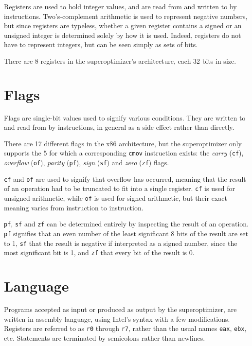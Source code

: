 \documentclass[a4paper,11pt]{kth-mag}
\begin{document}
Registers are used to hold integer values, and are read from and written to by instructions.
Two's-complement arithmetic is used to represent negative numbers, but since registers are typeless, whether a given register contains a signed or an unsigned integer is determined solely by how it is used.
Indeed, registers do not have to represent integers, but can be seen simply as sets of bits.

There are 8 registers in the superoptimizer's architecture, each 32 bits in size.

\section{Flags}
\label{s:flags}

Flags are single-bit values used to signify various conditions.
They are written to and read from by instructions, in general as a side effect rather than directly.

There are 17 different flags in the x86 architecture, but the superoptimizer only supports the 5 for which a corresponding \verb|cmov| instruction exists:
the \emph{carry} (\verb|cf|), \emph{overflow} (\verb|of|), \emph{parity} (\verb|pf|), \emph{sign} (\verb|sf|) and \emph{zero} (\verb|zf|) flags.

\verb|cf| and \verb|of| are used to signify that overflow has occurred, meaning that the result of an operation had to be truncated to fit into a single register.
\verb|cf| is used for unsigned arithmetic, while \verb|of| is used for signed arithmetic, but their exact meaning varies from instruction to instruction.

\verb|pf|, \verb|sf| and \verb|zf| can be determined entirely by inspecting the result of an operation.
\verb|pf| signifies that an even number of the least significant 8 bits of the result are set to 1,
\verb|sf| that the result is negative if interpreted as a signed number, since the most significant bit is 1,
and \verb|zf| that every bit of the result is 0.

\section{Language}
\label{s:language}

Programs accepted as input or produced as output by the superoptimizer, are written in assembly language, using Intel's syntax with a few modifications.
Registers are referred to as \verb|r0| through \verb|r7|, rather than the usual names \verb|eax|, \verb|ebx|, etc.
Statements are terminated by semicolons rather than newlines.
\end{document}
